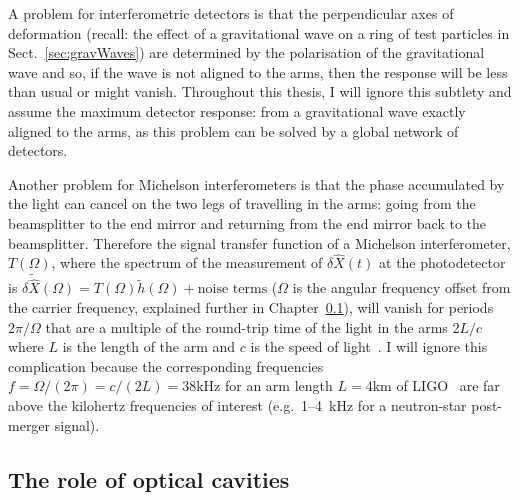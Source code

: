 A problem for interferometric detectors is that the perpendicular axes of deformation (recall: the effect of a gravitational wave on a ring of test particles in Sect.~\ref{sec:gravWaves}) are determined by the polarisation of the gravitational wave and so, if the wave is not aligned to the arms, then the response will be less than usual or might vanish. Throughout this thesis, I will ignore this subtlety and assume the maximum detector response: from a gravitational wave exactly aligned to the arms, as this problem can be solved by a global network of detectors. %

Another problem for Michelson interferometers is that the phase accumulated by the light can cancel on the two legs of travelling in the arms: going from the beamsplitter to the end mirror and returning from the end mirror back to the beamsplitter.
Therefore the signal transfer function of a Michelson interferometer, $T(\Omega)$, where the spectrum of the measurement of $\delta\hat{X}(t)$ at the photodetector is $\delta\tilde{\hat{X}}(\Omega) = T(\Omega) \tilde{h}(\Omega) + \text{noise terms}$ ($\Omega$ is the angular frequency offset from the carrier frequency, explained further in Chapter~\ref{}), will vanish for periods $2\pi/\Omega$ that are a multiple of the round-trip time of the light in the arms $2L/c$ where $L$ is the length of the arm and $c$ is the speed of light~\cite{}. 
I will ignore this complication because the corresponding frequencies $f=\Omega/(2\pi)=c/(2L)=38\mathrm{kHz}$ for an arm length $L=4\mathrm{km}$ of LIGO~\cite{} are far above the kilohertz frequencies of interest (e.g.\ 1--4~kHz for a neutron-star post-merger signal).

\subsection{The role of optical cavities}

